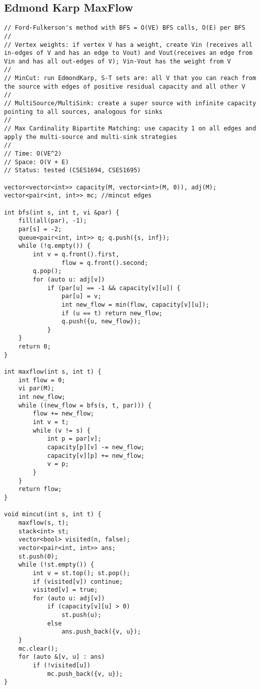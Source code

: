 \documentclass[12pt, a4paper, twoside]{article}
\begin{document}
\subsection{Edmond Karp MaxFlow}
\begin{lstlisting}
// Ford-Fulkerson's method with BFS = O(VE) BFS calls, O(E) per BFS
//
// Vertex weights: if vertex V has a weight, create Vin (receives all in-edges of V and has an edge to Vout) and Vout(receives an edge from Vin and has all out-edges of V); Vin-Vout has the weight from V
//
// MinCut: run EdmondKarp, S-T sets are: all V that you can reach from the source with edges of positive residual capacity and all other V
//
// MultiSource/MultiSink: create a super source with infinite capacity pointing to all sources, analogous for sinks
//
// Max Cardinality Bipartite Matching: use capacity 1 on all edges and apply the multi-source and multi-sink strategies
//
// Time: O(VE^2)
// Space: O(V + E)
// Status: tested (CSES1694, CSES1695)

vector<vector<int>> capacity(M, vector<int>(M, 0)), adj(M);
vector<pair<int, int>> mc; //mincut edges

int bfs(int s, int t, vi &par) {
	fill(all(par), -1);
	par[s] = -2;
	queue<pair<int, int>> q; q.push({s, inf});
	while (!q.empty()) {
		int v = q.front().first,
				flow = q.front().second;
		q.pop();
		for (auto u: adj[v])
			if (par[u] == -1 && capacity[v][u]) {
				par[u] = v;
				int new_flow = min(flow, capacity[v][u]);
				if (u == t) return new_flow;
				q.push({u, new_flow});
			}
	}
	return 0;
}

int maxflow(int s, int t) {
	int flow = 0;
	vi par(M);
	int new_flow;
	while ((new_flow = bfs(s, t, par))) {
		flow += new_flow;
		int v = t;
		while (v != s) {
			int p = par[v];
			capacity[p][v] -= new_flow;
			capacity[v][p] += new_flow;
			v = p;
		}
	}
	return flow;
}

void mincut(int s, int t) {
	maxflow(s, t);
	stack<int> st;
	vector<bool> visited(n, false);
	vector<pair<int, int>> ans;
	st.push(0);
	while (!st.empty()) {
		int v = st.top(); st.pop();
		if (visited[v]) continue;
		visited[v] = true;
		for (auto u: adj[v])
			if (capacity[v][u] > 0)
				st.push(u);
			else
				ans.push_back({v, u});
	}
	mc.clear();
	for (auto &[v, u] : ans)
		if (!visited[u])
			mc.push_back({v, u});
}
\end{lstlisting}
\end{document}
